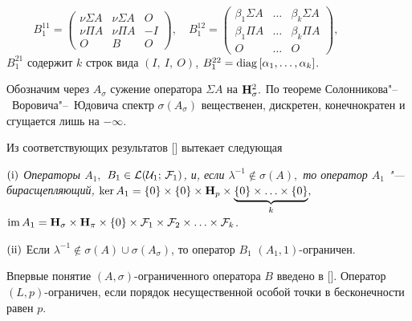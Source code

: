 \begin{displaymath}
B_1^{11}=
\left( \begin{array}{ccc}
\nu \Sigma A & \nu \Sigma A & O\\
\nu \Pi A  & \nu \Pi A& -I \\
O & B & O
\end{array} \right) ,\quad
B_1^{12}=
\left( \begin{array}{ccc}
{ \beta}_1 \Sigma  A &  \ldots & {\beta}_k \Sigma A \\
{ \beta}_1 \Pi  A &  \ldots & {\beta}_k \Pi A \\
    O &\ldots & O
\end{array} \right) , \qquad \qquad
\end{displaymath}
$B_1^{21}$ содержит $k$ строк вида $(I,~I,~O)$, $B_1^{22}={\rm diag}\, [\alpha_1, \ldots,\alpha_k]$.



\begin{remark}[2]  Обозначим через $A_{\sigma}$ сужение оператора $\Sigma A$
на
${\bf H}_{\sigma}^2.$  По   теореме  Солонникова"--~Воровича"--~Юдовича  спектр $\sigma(A_{\sigma})$
вещественен, дискретен,  конечнократен  и  сгущается лишь на
$- \infty .$
\end{remark}

Из соответствующих результатов [] вытекает следующая


\begin{theorem}[4]{\it ${\rm   (i)} $ Операторы $A_1,$ $ B_1 \in {\cal L} ({\cal U}_1;\,{\cal F}_1)$, и, если
${\lambda}^{-1} \not\in \sigma (A),$ то оператор  $A_1$  "---  бирасщепляющий, $\ker A_1= \{0 \} \times \{ 0 \} \times {\bf H}_p \times \underbrace{\{ 0 \} \times \ldots \times \{ 0\}}_{k},$
${\rm im}\, A_1={\bf H}_{\sigma} \times {\bf H}_{\pi} \times \{ 0 \} \times {{\cal F}_1} \times {{\cal F}_2} \times \ldots \times {{\cal F}_k} $.

${\rm   (ii)} $ Если ${\lambda}^{-1} \not\in \sigma (A) \cup
\sigma(A_{\sigma})$, то оператор $B_1$ $(A_1, 1)$-ограничен.}
\end{theorem}

\smallskip

\begin{remark}[3]
 Впервые понятие $(A,\sigma )$-ограниченного оператора $B$ введено в [].
Оператор $(L,p)$-ограничен, если порядок несущественной особой точки в бесконечности равен $p.$ 
\end{remark}

